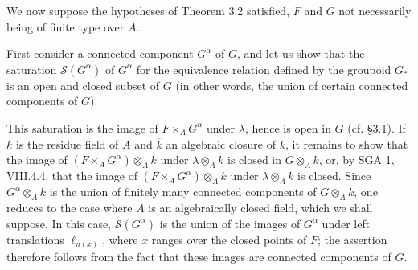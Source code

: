 We now suppose the hypotheses of Theorem 3.2 satisfied, $F$ and $G$ not necessarily being of finite type over $A$.

First consider a connected component $G^\alpha$ of $G$, and let us show that the saturation $\mathcal S(G^\alpha)$ of $G^\alpha$ for the equivalence relation defined by the groupoid $G_*$ is an open and closed subset of $G$ (in other words, the union of certain connected components of $G$).

This saturation is the image of $F\times_AG^\alpha$ under $\lambda$, hence is open in $G$ (cf. §3.1). If $k$ is the residue field of $A$ and $\overline k$ an algebraic closure of $k$, it remains to show that the image of $(F\times_AG^\alpha)\otimes_Ak$ under $\lambda\otimes_Ak$ is closed in $G\otimes_Ak$, or, by SGA 1, VIII.4.4, that the image of $(F\times_AG^\alpha)\otimes_A\overline k$ under $\lambda\otimes_A\overline k$ is closed. Since $G^\alpha\otimes_A\overline k$ is the union of finitely many connected components of $G\otimes_A\overline k$, one reduces to the case where $A$ is an algebraically closed field, which we shall suppose. In this case, $\mathcal S(G^\alpha)$ is the union of the images of $G^\alpha$ under left translations $\ell_{u(x)}$, where $x$ ranges over the closed points of $F$; the assertion therefore follows from the fact that these images are connected components of $G$.
